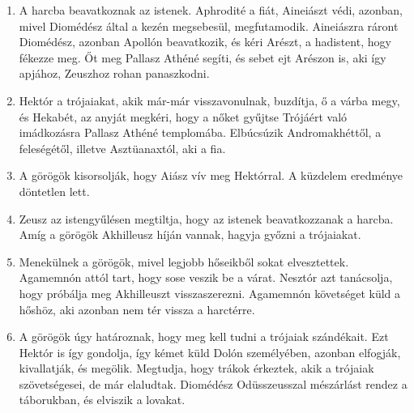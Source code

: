 \documentclass[]{article}
\begin{document}
\begin{enumerate}
				\item A harcba beavatkoznak az istenek. Aphrodité a fiát, Aineiászt védi, azonban, mivel Diomédész által a kezén megsebesül, megfutamodik. Aineiászra ráront Diomédész, azonban Apollón beavatkozik, és kéri Arészt, a hadistent, hogy fékezze meg. Őt meg Pallasz Athéné segíti, és sebet ejt Arészon is, aki így apjához, Zeuszhoz rohan panaszkodni.
				
				\item Hektór a trójaiakat, akik már-már visszavonulnak, buzdítja, ő a várba megy, és Hekabét, az anyját megkéri, hogy a nőket gyűjtse Trójáért való imádkozásra Pallasz Athéné templomába. Elbúcsúzik Andromakhéttől, a feleségétől, illetve Asztüanaxtól, aki a fia.
				
				\item A görögök kisorsolják, hogy Aiász vív meg Hektórral. A küzdelem eredménye döntetlen lett. 
				
				\item Zeusz az istengyűlésen megtiltja, hogy az istenek beavatkozzanak a harcba. Amíg a görögök Akhilleusz híján vannak, hagyja győzni a trójaiakat.
				
				\item Menekülnek a görögök, mivel legjobb hőseikből sokat elvesztettek. Agamemnón attól tart, hogy sose veszik be a várat. Nesztór azt tanácsolja, hogy próbálja meg Akhilleuszt visszaszerezni. Agamemnón követséget küld a hőshöz, aki azonban nem tér vissza a harctérre.
				
				\item A görögök úgy határoznak, hogy meg kell tudni a trójaiak szándékait. Ezt Hektór is így gondolja, így kémet küld Dolón személyében, azonban elfogják, kivallatják, és megölik. Megtudja, hogy trákok érkeztek, akik a trójaiak szövetségesei, de már elaludtak. Diomédész Odüsszeusszal mészárlást rendez a táborukban, és elviszik a lovakat.
			\end{enumerate}
			\cite{WIliasz_en}
			\cite{Iliasz_tartalom}


\end{document}
